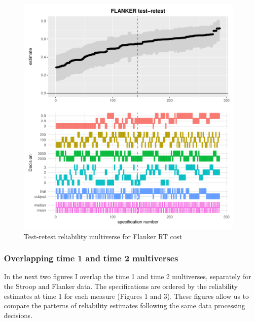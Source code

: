 \documentclass[
  english,
  man,floatsintext]{apa6}
\begin{document}
\begin{figure}
\centering
\includegraphics{Reliability_Multiverse_files/figure-latex/unnamed-chunk-10-1.pdf}
\caption{\label{fig:unnamed-chunk-10}Test-retest reliability multiverse for Flanker RT cost}
\end{figure}

\newpage

\hypertarget{overlapping-time-1-and-time-2-multiverses}{%
\subsubsection{Overlapping time 1 and time 2 multiverses}\label{overlapping-time-1-and-time-2-multiverses}}

In the next two figures I overlap the time 1 and time 2 multiverses, separately for the Stroop and Flanker data. The specifications are ordered by the reliability estimates at time 1 for each measure (Figures 1 and 3). These figures allow us to compare the patterns of reliability estimates following the same data processing decisions.
\end{document}
